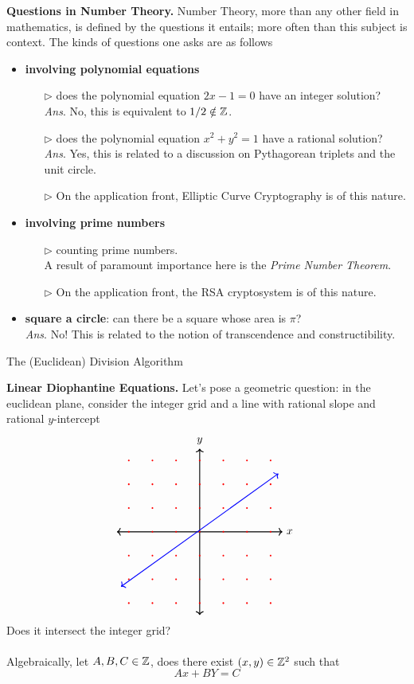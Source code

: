 {\bf\large Questions in Number Theory.} Number Theory, more than any other field in mathematics, is defined by the questions it entails; more often than this subject is context. The kinds of questions one asks are as follows
\begin{itemize}
\item \textbf{involving polynomial equations}
\begin{itemize}
\item[$\triangleright$] does the polynomial equation $2x - 1 = 0$ have an integer solution?\\[0.2em]
\emph{Ans}. No, this is equivalent to $1/2 \notin \mathbb Z$.
\item[$\triangleright$] does the polynomial equation $x^2 + y^2 = 1$ have a rational solution?\\[0.2em]
\emph{Ans}. Yes, this is related to a discussion on Pythagorean triplets and the unit circle.
\item[$\triangleright$] On the application front, Elliptic Curve Cryptography is of this nature.
\end{itemize}
\item \textbf{involving prime numbers}
\begin{itemize}
\item[$\triangleright$] counting prime numbers.\\[0.2em]
A result of paramount importance here is the \emph{Prime Number Theorem}.
\item[$\triangleright$] On the application front, the RSA cryptosystem is of this nature.
\end{itemize}
\item \textbf{square a circle}: can there be a square whose area is $\pi$?\\[0.2em]
\emph{Ans}. No! This is related to the notion of transcendence and constructibility.
\end{itemize}

\vspace*{2em}

\begin{center}
{\Large The (Euclidean) Division Algorithm}
\end{center}

{\bf\large Linear Diophantine Equations.}
Let's pose a geometric question: in the euclidean plane, consider the integer grid and a line with rational slope and rational $y$-intercept
\[\begin{tikzpicture}[scale=0.75]
    \draw[<->,thick] (-3.5,0)--(3.5,0) node[right]{$x$};
	\draw[<->,thick] (0,-3.5)--(0,3.5) node[above]{$y$};
    \foreach \x in {-3,-2,-1,0,1,2,3}
    \foreach \y in {-3,-2,-1,0,1,2,3}
    {
    \fill[red] (\x,\y) circle (1pt);
    }
    \draw[<->,blue,thick] (-3.33,-2.307) -- (3.33,2.45);
  \end{tikzpicture}\]
Does it intersect the integer grid?\\
\\
Algebraically, let $A,B,C \in \mathbb Z$, does there exist $(x,y) \in \mathbb Z^2$ such that
\[Ax + BY = C\]

